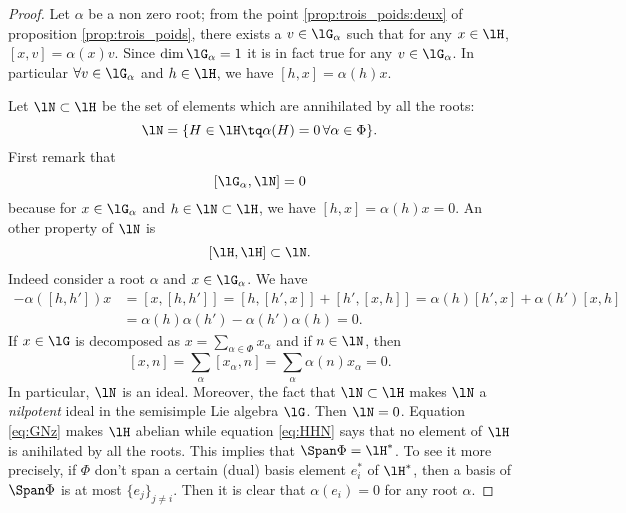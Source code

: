 \begin{proof}
Let $\alpha$ be a non zero root; from the point \ref{prop:trois_poids:deux} of proposition \ref{prop:trois_poids}, there exists a $v\in\lG_{\alpha}$ such that for any $x\in\lH$, $[x,v]=\alpha(x)v$. Since $\dim\lG_{\alpha}=1$ it is in fact true for any $v\in\lG_{\alpha}$. In particular $\forall v\in\lG_{\alpha}$ and $h\in\lH$, we have $[h,x]=\alpha(h)x$.

Let $\lN\subset\lH$ be the set of elements which are annihilated by all the roots:
\begin{equation}
    \lN=\{ H\in\lH\tq\alpha(H)=0\,\forall \alpha\in\Phi \}.
\end{equation}
First remark that 
\begin{equation}\label{eq:GNz}
[\lG_{\alpha},\lN]=0
\end{equation}
because for $x\in\lG_{\alpha}$ and $h\in\lN\subset\lH$, we have $[h,x]=\alpha(h)x=0$. An other property of $\lN$ is
\begin{equation}\label{eq:HHN}
[\lH,\lH]\subset\lN.
\end{equation}
Indeed consider a root $\alpha$ and $x\in\lG_{\alpha}$. We have
\begin{equation}
\begin{split}
-\alpha([h,h'])x&=[x,[h,h']]
=[h,[h',x]]+[h',[x,h]]
=\alpha(h)[h',x]+\alpha(h')[x,h]\\
&=\alpha(h)\alpha(h')-\alpha(h')\alpha(h)
=0.
\end{split}
\end{equation}
If $x\in\lG$ is decomposed as $x=\sum_{\alpha\in\Phi}x_{\alpha}$ and if $n\in\lN$, then
\[
[x,n]=\sum_{\alpha}[x_{\alpha},n]=\sum_{\alpha}\alpha(n)x_{\alpha}=0.
\]
In particular, $\lN$ is an ideal. Moreover, the fact that $\lN\subset\lH$ makes $\lN$ a \emph{nilpotent} ideal in the semisimple Lie algebra $\lG$. Then $\lN=0$. Equation \eqref{eq:GNz} makes $\lH$ abelian while equation \eqref{eq:HHN} says that no element of $\lH$ is anihilated by all the roots. This implies that $\Span\Phi=\lH^*$. To see it more precisely, if $\Phi$ don't span a certain (dual) basis element $e_i^*$ of $\lH^*$, then a basis of $\Span\Phi$ is at most $\{e_j\}_{j\neq i}$. Then it is clear that $\alpha(e_i)=0$ for any root $\alpha$.
\end{proof}


